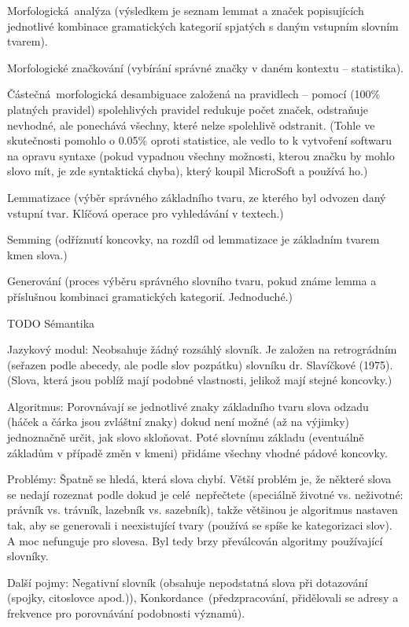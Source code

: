 \documentclass[12pt]{article}					%
\begin{document}
\begin{poznamka}
	Morfologická analýza (výsledkem je seznam lemmat a značek popisujících jednotlivé kombinace gramatických kategorií spjatých s daným vstupním slovním tvarem).

	Morfologické značkování (vybírání správné značky v daném kontextu – statistika).

	Částečná morfologická desambiguace založená na pravidlech – pomocí (100\% platných pravidel) spolehlivých pravidel redukuje počet značek, odstraňuje nevhodné, ale ponechává všechny, které nelze spolehlivě odstranit. (Tohle ve skutečnosti pomohlo o 0.05\% oproti statistice, ale vedlo to k vytvoření softwaru na opravu syntaxe (pokud vypadnou všechny možnosti, kterou značku by mohlo slovo mít, je zde syntaktická chyba), který koupil MicroSoft a používá ho.)

	Lemmatizace (výběr správného základního tvaru, ze kterého byl odvozen daný vstupní tvar. Klíčová operace pro vyhledávání v textech.)

	Semming (odříznutí koncovky, na rozdíl od lemmatizace je základním tvarem kmen slova.)

	Generování (proces výběru správného slovního tvaru, pokud známe lemma a příslušnou kombinaci gramatických kategorií. Jednoduché.)
\end{poznamka}


TODO Sémantika


\begin{definice}
	Jazykový modul: Neobsahuje žádný rozsáhlý slovník. Je založen na retrográdním (seřazen podle abecedy, ale podle slov pozpátku) slovníku dr. Slavíčkové (1975). (Slova, která jsou poblíž mají podobné vlastnosti, jelikož mají stejné koncovky.)

	Algoritmus: Porovnávají se jednotlivé znaky základního tvaru slova odzadu (háček a čárka jsou zvláštní znaky) dokud není možné (až na výjimky) jednoznačně určit, jak slovo skloňovat. Poté slovnímu základu (eventuálně základům v případě změn v kmeni) přidáme všechny vhodné pádové koncovky.

	Problémy: Špatně se hledá, která slova chybí. Větší problém je, že některé slova se nedají rozeznat podle dokud je celé nepřečtete (speciálně životné vs. neživotné: právník vs. trávník, lazebník vs. sazebník), takže většinou je algoritmus nastaven tak, aby se generovali i neexistující tvary (používá se spíše ke kategorizaci slov). A moc nefunguje pro slovesa. Byl tedy brzy převálcován algoritmy používající slovníky.

	Další pojmy: Negativní slovník (obsahuje nepodstatná slova při dotazování (spojky, citoslovce apod.)), Konkordance (předzpracování, přidělovali se adresy a frekvence pro porovnávání podobnosti významů).
\end{definice}
\end{document}
